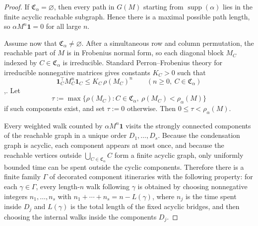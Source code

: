 \documentclass{etds}%
\numberwithin{equation}{section}
\theoremstyle{plain}
\theoremstyle{definition}
\theoremstyle{remark}
\begin{document}
\begin{proof}
If $\mathfrak{C}_\alpha=\varnothing$, then every path in $G(M)$ starting from
$\operatorname{supp}(\alpha)$ lies in the finite acyclic reachable subgraph.
Hence there is a maximal possible path length, so $\alpha M^n\mathbf{1}=0$ for
all large $n$.

Assume now that $\mathfrak{C}_\alpha\neq\varnothing$.  After a simultaneous row
and column permutation, the reachable part of $M$ is in Frobenius normal form,
so each diagonal block $M_C$ indexed by $C\in\mathfrak{C}_\alpha$ is
irreducible.  Standard Perron--Frobenius theory for irreducible nonnegative
matrices gives constants $K_C>0$ such that
\[
\mathbf{1}_C^\top M_C^n\mathbf{1}_C\le K_C\,\rho(M_C)^n
\qquad(n\ge 0,\ C\in\mathfrak{C}_\alpha)
\]
\cite[Ch.~1]{Seneta2006},\cite[Chs.~3--4]{BermanPlemmons1994}.  Let
\[
\tau:=\max\{\rho(M_C):C\in\mathfrak{C}_\alpha,\ \rho(M_C)<\rho_\alpha(M)\}
\]
if such components exist, and set $\tau:=0$ otherwise.  Then
$0\le \tau<\rho_\alpha(M)$.

Every weighted walk counted by $\alpha M^n\mathbf{1}$ visits the strongly
connected components of the reachable graph in a unique order
$D_1,\dots,D_s$.  Because the condensation graph is acyclic, each component
appears at most once, and because the reachable vertices outside
$\bigcup_{C\in\mathfrak{C}_\alpha}C$ form a finite acyclic graph, only
uniformly bounded time can be spent outside the cyclic components.  Therefore
there is a finite family $\Gamma$ of decorated component itineraries with the
following property: for each $\gamma\in\Gamma$, every length-$n$ walk following
$\gamma$ is obtained by choosing nonnegative integers $n_1,\dots,n_s$ with
$n_1+\cdots+n_s=n-L(\gamma)$, where $n_j$ is the time spent inside $D_j$ and
$L(\gamma)$ is the total length of the fixed acyclic bridges, and then choosing
the internal walks inside the components $D_j$.


\end{proof}
\end{document}
